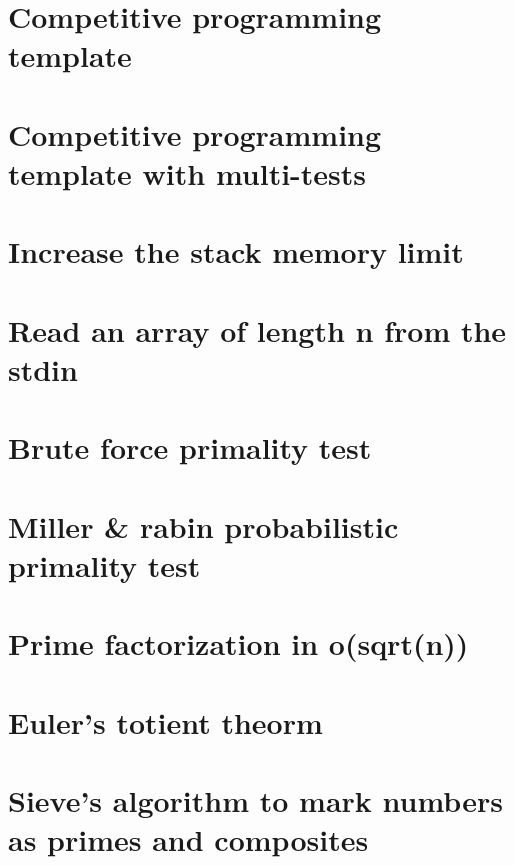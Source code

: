 \section{Competitive programming template}
\raggedbottom

\section{Competitive programming template with multi-tests}
\raggedbottom

\section{Increase the stack memory limit}
\raggedbottom

\section{Read an array of length n from the stdin}
\raggedbottom

\section{Brute force primality test}
\raggedbottom

\section{Miller \& rabin probabilistic primality test}
\raggedbottom

\section{Prime factorization in o(sqrt(n))}
\raggedbottom

\section{Euler's totient theorm}
\raggedbottom

\section{Sieve's algorithm to mark numbers as primes and composites}
\raggedbottom


